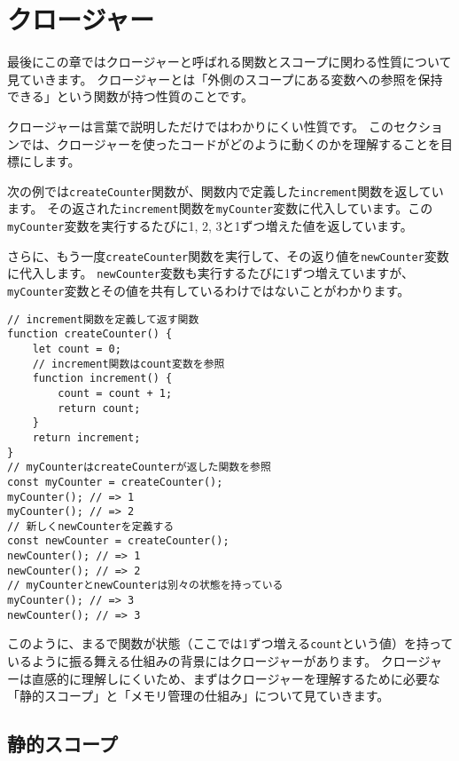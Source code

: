 \hypertarget{closure}{%
\section{クロージャー}\label{closure}}

最後にこの章ではクロージャーと呼ばれる関数とスコープに関わる性質について見ていきます。
クロージャーとは「外側のスコープにある変数への参照を保持できる」という関数が持つ性質のことです。

クロージャーは言葉で説明しただけではわかりにくい性質です。
このセクションでは、クロージャーを使ったコードがどのように動くのかを理解することを目標にします。

次の例では\texttt{createCounter}関数が、関数内で定義した\texttt{increment}関数を返しています。
その返された\texttt{increment}関数を\texttt{myCounter}変数に代入しています。この\texttt{myCounter}変数を実行するたびに1,
2, 3と1ずつ増えた値を返しています。

さらに、もう一度\texttt{createCounter}関数を実行して、その返り値を\texttt{newCounter}変数に代入します。
\texttt{newCounter}変数も実行するたびに1ずつ増えていますが、\texttt{myCounter}変数とその値を共有しているわけではないことがわかります。

\begin{lstlisting}
// increment関数を定義して返す関数
function createCounter() {
    let count = 0;
    // increment関数はcount変数を参照
    function increment() {
        count = count + 1;
        return count;
    }
    return increment;
}
// myCounterはcreateCounterが返した関数を参照
const myCounter = createCounter();
myCounter(); // => 1
myCounter(); // => 2
// 新しくnewCounterを定義する
const newCounter = createCounter();
newCounter(); // => 1
newCounter(); // => 2
// myCounterとnewCounterは別々の状態を持っている
myCounter(); // => 3
newCounter(); // => 3
\end{lstlisting}

このように、まるで関数が状態（ここでは1ずつ増える\texttt{count}という値）を持っているように振る舞える仕組みの背景にはクロージャーがあります。
クロージャーは直感的に理解しにくいため、まずはクロージャーを理解するために必要な「静的スコープ」と「メモリ管理の仕組み」について見ていきます。

\hypertarget{static-scope}{%
\subsection{静的スコープ}\label{static-scope}}

